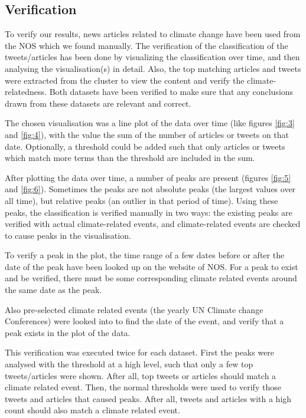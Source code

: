 \documentclass[paper=a4, fontsize=9px]{scrartcl} %
\numberwithin{equation}{section} %
\numberwithin{figure}{section} %
\numberwithin{table}{section} %
\begin{document}
\begin{multicols}{2}
\subsection{Verification}

To verify our results, news articles related to climate change have been used from the NOS which we found manually. The verification of the classification of the tweets/articles has been done by visualizing the classification over time, and then analysing the visualisation(s) in detail. Also, the top matching articles and tweets were extracted from the cluster to view the content and verify the climate-relatedness. Both datasets have been verified to make sure that any conclusions drawn from these datasets are relevant and correct.

The chosen visualisation was a line plot of the data over time (like figures \ref{fig:3} and \ref{fig:4}), with the value the sum of the number of articles or tweets on that date. Optionally, a threshold could be added such that only articles or tweets which match more terms than the threshold are included in the sum.

After plotting the data over time, a number of peaks are present (figures \ref{fig:5} and \ref{fig:6}). Sometimes the peaks are not absolute peaks (the largest values over all time), but relative peaks (an outlier in that period of time). Using these peaks, the classification is verified manually in two ways: the existing peaks are verified with actual climate-related events, and climate-related events are checked to cause peaks in the visualisation.

To verify a peak in the plot, the time range of a few dates before or after the date of the peak have been looked up on the website of NOS. For a peak to exist and be verified, there must be some corresponding climate related events around the same date as the peak.

Also pre-selected climate related events (the yearly UN Climate change Conferences) were looked into to find the date of the event, and verify that a peak exists in the plot of the data. 

This verification was executed twice for each dataset. First the peaks were analysed with the threshold at a high level, such that only a few top tweets/articles were shown. After all, top tweets or articles should match a climate related event. Then, the normal thresholds were used to verify those tweets and articles that caused peaks. After all, tweets and articles with a high count should also match a climate related event.




\end{multicols}
\end{document}
